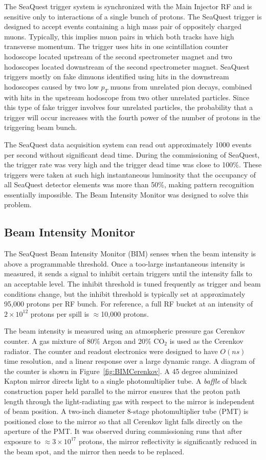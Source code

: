 The SeaQuest trigger system is synchronized with the Main Injector RF and is sensitive only to interactions of a single bunch of protons.  The SeaQuest trigger is designed to accept events containing a high mass pair of oppositely charged muons.  Typically, this implies muon pairs in which both tracks have high transverse momentum.  The trigger uses hits in one scintillation counter hodoscope located upstream of the second spectrometer magnet and two hodoscopes located downstream of the second spectrometer magnet.  SeaQuest triggers mostly on fake dimuons identified using hits in the downstream hodoscopes caused by two low $p_T$ muons from unrelated pion decays, combined with hits in the upstream hodoscope from two other unrelated particles.  Since this type of fake trigger involves four unrelated particles, the probability that a trigger will occur increases with the fourth power of the number of protons in the triggering beam bunch.

The SeaQuest data acquisition system can read out approximately 1000 events per second without significant dead time.  During the commissioning of SeaQuest, the trigger rate was very high and the trigger dead time was close to 100\%.  These triggers were taken at such high instantaneous luminosity that the occupancy of all SeaQuest detector elements was more than 50$\%$, making pattern recognition essentially impossible.  The Beam Intensity Monitor was designed to solve this problem.


\subsection{Beam Intensity Monitor}
The SeaQuest Beam Intensity Monitor (BIM) senses when the beam intensity is above a programmable threshold. Once a too-large instantaneous intensity is measured, it sends a signal to inhibit certain triggers until the intensity falls to an acceptable level.  The inhibit threshold is tuned frequently as trigger and beam conditions change, but the inhibit threshold is typically set at approximately 95,000 protons per RF bunch. For reference, a full RF bucket at an intensity of $2\times10^{12}$ protons per spill is $\approx$10,000 protons.

The beam intensity is measured using an atmospheric pressure gas Cerenkov counter. A gas mixture of 80$\%$ Argon and 20$\%$ CO$_2$ is used as the Cerenkov radiator. The counter and readout electronics were designed to have $O(ns)$ time resolution, and a linear response over a large dynamic range.  A diagram of the counter is shown in Figure~\ref{fig:BIMCerenkov}.  A 45 degree aluminized Kapton mirror directs light to a single photomultiplier tube.  A \emph{baffle} of black construction paper held parallel to the mirror ensures that the proton path length through the light-radiating gas with respect to the mirror is independent of beam position.  A two-inch diameter 8-stage photomultiplier tube (PMT) is positioned close to the mirror so that all Cerenkov light falls directly on the aperture of the PMT. It was observed during commissioning runs that after exposure to $\approx3\times10^{17}$ protons, the mirror reflectivity is significantly reduced in the beam spot, and the mirror then needs to be replaced.

